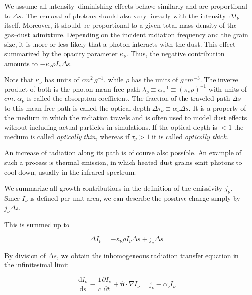 We assume all intensity--diminishing effects behave similarly and are proportional to $\Delta s$.
The removal of photons should also vary linearly with the intensity $\Delta I_{\nu}$ itself.
Moreover, it should be proportional to a given total mass density of the gas--dust admixture.
Depending on the incident radiation frequency and the grain size, it is more or less likely that a photon interacts with the dust.
This effect summarized by the opacity parameter $\kappa_{\nu}$.
Thus, the negative contribution amounts to $-\kappa_{\nu}\rho I_{\nu}\Delta s$.

Note that $\kappa_{\nu}$ has units of $cm^2\,g^{-1}$, while $\rho$ has the units of $g\,cm^{-3}$.
The inverse product of both is the photon mean free path $\lambda_{\nu} \equiv \alpha_{\nu}^{-1} \equiv (\kappa_{\nu}\rho)^{-1}$ with units of $cm$.
$\alpha_{\nu}$ is called the absorption coefficient.
The fraction of the traveled path $\Delta s$ to this mean free path is called the optical depth $\Delta\tau_{\nu} \equiv \alpha_{\nu}\Delta s$.
It is a property of the medium in which the radiation travels and is often used to model dust effects without including actual particles in simulations.
If the optical depth is $<1$ the medium is called \textit{optically thin}, whereas if $\tau_{\nu}>1$ it is called \textit{optically thick}.

An increase of radiation along its path is of course also possible.
An example of such a process is thermal emission, in which heated dust grains emit photons to cool down, usually in the infrared spectrum.

We summarize all growth contributions in the definition of the emissivity $j_{\nu}$.
Since $I_{\nu}$ is defined per unit area, we can describe the positive change simply by $j_{\nu}\Delta s$.

This is summed up to

\begin{equation}
  \Delta I_{\nu} = -\kappa_{\nu}\rho I_{\nu}\Delta s + j_{\nu}\Delta s
\label{eq:Source_term_derivation}
\end{equation}

By division of $\Delta s$, we obtain the inhomogeneous radiation transfer equation in the infinitesimal limit

\begin{equation}
  \frac{\mathrm{d}I_{\nu}}{\mathrm{d}s} \equiv \frac{1}{c}\frac{\partial I_{\nu}}{\partial t} + \hat{\textbf{n}}\cdot\nabla I_{\nu} = j_{\nu} - \alpha_{\nu}I_{\nu}
\label{eq:Radiative_transfer}
\end{equation}

